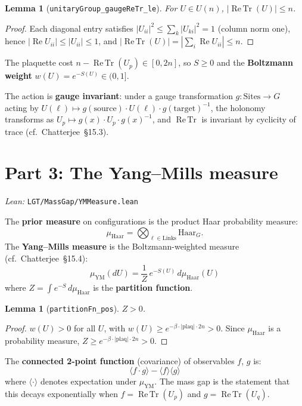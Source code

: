 \documentclass[11pt,a4paper]{article}
\newtheorem{lemma}[theorem]{Lemma}
\theoremstyle{definition}
\newcommand{\ReTr}{\operatorname{Re\,Tr}}
\begin{document}
\begin{lemma}[\texttt{unitaryGroup\_gaugeReTr\_le}]
For $U \in U(n)$, $|\ReTr(U)| \leq n$.
\end{lemma}
\begin{proof}
Each diagonal entry satisfies
$|U_{ii}|^2 \leq \sum_k |U_{ki}|^2 = 1$ (column norm one),
hence $|\operatorname{Re} U_{ii}| \leq |U_{ii}| \leq 1$, and
$|\ReTr(U)| = |\sum_i \operatorname{Re} U_{ii}| \leq n$.
\end{proof}

The plaquette cost $n - \ReTr(U_p) \in [0, 2n]$, so $S \geq 0$
and the \textbf{Boltzmann weight} $w(U) = e^{-S(U)} \in (0, 1]$.

The action is \textbf{gauge invariant}: under a gauge transformation
$g\colon \text{Sites} \to G$ acting by
$U(\ell) \mapsto g(\text{source}) \cdot U(\ell) \cdot g(\text{target})^{-1}$,
the holonomy transforms as
$U_p \mapsto g(x) \cdot U_p \cdot g(x)^{-1}$, and $\ReTr$ is
invariant by cyclicity of trace (cf.\ Chatterjee~\S15.3).

\section{Part 3: The Yang--Mills measure}

\textit{Lean:} \texttt{LGT/MassGap/YMMeasure.lean}

\medskip

The \textbf{prior measure} on configurations is the product Haar
probability measure:
\[
  \mu_{\mathrm{Haar}} = \bigotimes_{\ell \in \text{Links}} \mathrm{Haar}{}_G.
\]
The \textbf{Yang--Mills measure} is the Boltzmann-weighted measure
(cf.\ Chatterjee~\S15.4):
\[
  \mu_{\mathrm{YM}}(dU)
  = \frac{1}{Z}\, e^{-S(U)} \, d\mu_{\mathrm{Haar}}(U)
\]
where $Z = \int e^{-S}\, d\mu_{\mathrm{Haar}}$ is the \textbf{partition function}.

\begin{lemma}[\texttt{partitionFn\_pos}]
$Z > 0$.
\end{lemma}
\begin{proof}
$w(U) > 0$ for all $U$, with $w(U) \geq e^{-\beta \cdot |\text{plaq}| \cdot 2n} > 0$.
Since $\mu_{\mathrm{Haar}}$ is a probability measure,
$Z \geq e^{-\beta \cdot |\text{plaq}| \cdot 2n} > 0$.
\end{proof}

The \textbf{connected 2-point function} (covariance) of
observables $f$, $g$ is:
\[
  \langle f \cdot g \rangle - \langle f \rangle \langle g \rangle
\]
where $\langle \cdot \rangle$ denotes expectation under $\mu_{\mathrm{YM}}$.
The mass gap is the statement that this decays exponentially when
$f = \ReTr(U_p)$ and $g = \ReTr(U_q)$.
\end{document}
